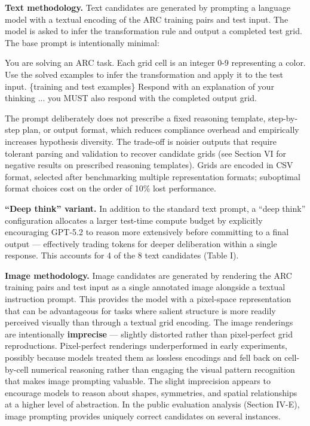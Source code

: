 \documentclass[conference]{IEEEtran}
\newenvironment{Shaded}{}{}
\newcommand{\NormalTok}[1]{#1}
\renewenvironment{Shaded}{\begin{snugshade}}{\end{snugshade}}
\begin{document}
\textbf{Text methodology.} Text candidates are generated by prompting a
language model with a textual encoding of the ARC training pairs and
test input. The model is asked to infer the transformation rule and
output a completed test grid. The base prompt is intentionally minimal:

\begin{Shaded}
\begin{Highlighting}[]
\NormalTok{You are solving an ARC task. Each grid cell is an integer}
\NormalTok{0{-}9 representing a color. Use the solved examples to infer}
\NormalTok{the transformation and apply it to the test input.}
\NormalTok{\{training and test examples\}}
\NormalTok{Respond with an explanation of your thinking ... you MUST}
\NormalTok{also respond with the completed output grid.}
\end{Highlighting}
\end{Shaded}

The prompt deliberately does not prescribe a fixed reasoning template,
step-by-step plan, or output format, which reduces compliance overhead
and empirically increases hypothesis diversity. The trade-off is noisier
outputs that require tolerant parsing and validation to recover
candidate grids (see Section VI for negative results on prescribed
reasoning templates). Grids are encoded in CSV format, selected after
benchmarking multiple representation formats; suboptimal format choices
cost on the order of 10\% lost performance.

\textbf{``Deep think'' variant.} In addition to the standard text
prompt, a ``deep think'' configuration allocates a larger test-time
compute budget by explicitly encouraging GPT-5.2 to reason more
extensively before committing to a final output --- effectively trading
tokens for deeper deliberation within a single response. This accounts
for 4 of the 8 text candidates (Table I).

\textbf{Image methodology.} Image candidates are generated by rendering
the ARC training pairs and test input as a single annotated image
alongside a textual instruction prompt. This provides the model with a
pixel-space representation that can be advantageous for tasks where
salient structure is more readily perceived visually than through a
textual grid encoding. The image renderings are intentionally
\textbf{imprecise} --- slightly distorted rather than pixel-perfect grid
reproductions. Pixel-perfect renderings underperformed in early
experiments, possibly because models treated them as lossless encodings
and fell back on cell-by-cell numerical reasoning rather than engaging
the visual pattern recognition that makes image prompting valuable. The
slight imprecision appears to encourage models to reason about shapes,
symmetries, and spatial relationships at a higher level of abstraction.
In the public evaluation analysis (Section IV-E), image prompting
provides uniquely correct candidates on several instances.
\end{document}
